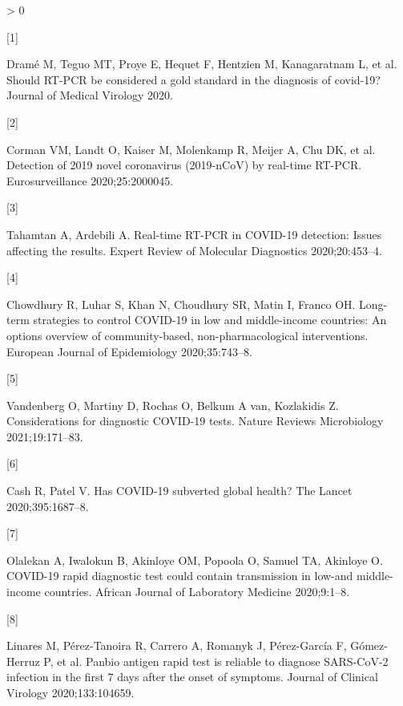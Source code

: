 \documentclass[]{elsarticle} %
\newlength{\cslhangindent}
\newlength{\csllabelwidth}
\newenvironment{CSLReferences}[2] %
 {%
  \setlength{\parindent}{0pt}
  \ifodd #1 \everypar{\setlength{\hangindent}{\cslhangindent}}\ignorespaces\fi
  \ifnum #2 > 0
  \setlength{\parskip}{#2\baselineskip}
  \fi
 }%
 {}
\newcommand{\CSLLeftMargin}[1]{\parbox[t]{\csllabelwidth}{#1}}
\newcommand{\CSLRightInline}[1]{\parbox[t]{\linewidth - \csllabelwidth}{#1}\break}
\begin{document}
\hypertarget{refs}{}
\begin{CSLReferences}{0}{0}
\leavevmode\hypertarget{ref-drame2020should}{}%
\CSLLeftMargin{{[}1{]} }
\CSLRightInline{Dramé M, Teguo MT, Proye E, Hequet F, Hentzien M, Kanagaratnam L, et al. Should RT-PCR be considered a gold standard in the diagnosis of covid-19? Journal of Medical Virology 2020.}

\leavevmode\hypertarget{ref-corman2020detection}{}%
\CSLLeftMargin{{[}2{]} }
\CSLRightInline{Corman VM, Landt O, Kaiser M, Molenkamp R, Meijer A, Chu DK, et al. Detection of 2019 novel coronavirus (2019-nCoV) by real-time RT-PCR. Eurosurveillance 2020;25:2000045.}

\leavevmode\hypertarget{ref-tahamtan2020real}{}%
\CSLLeftMargin{{[}3{]} }
\CSLRightInline{Tahamtan A, Ardebili A. Real-time RT-PCR in COVID-19 detection: Issues affecting the results. Expert Review of Molecular Diagnostics 2020;20:453--4.}

\leavevmode\hypertarget{ref-chowdhury2020long}{}%
\CSLLeftMargin{{[}4{]} }
\CSLRightInline{Chowdhury R, Luhar S, Khan N, Choudhury SR, Matin I, Franco OH. Long-term strategies to control COVID-19 in low and middle-income countries: An options overview of community-based, non-pharmacological interventions. European Journal of Epidemiology 2020;35:743--8.}

\leavevmode\hypertarget{ref-vandenberg2021considerations}{}%
\CSLLeftMargin{{[}5{]} }
\CSLRightInline{Vandenberg O, Martiny D, Rochas O, Belkum A van, Kozlakidis Z. Considerations for diagnostic COVID-19 tests. Nature Reviews Microbiology 2021;19:171--83.}

\leavevmode\hypertarget{ref-cash2020has}{}%
\CSLLeftMargin{{[}6{]} }
\CSLRightInline{Cash R, Patel V. Has COVID-19 subverted global health? The Lancet 2020;395:1687--8.}

\leavevmode\hypertarget{ref-olalekan2020covid}{}%
\CSLLeftMargin{{[}7{]} }
\CSLRightInline{Olalekan A, Iwalokun B, Akinloye OM, Popoola O, Samuel TA, Akinloye O. COVID-19 rapid diagnostic test could contain transmission in low-and middle-income countries. African Journal of Laboratory Medicine 2020;9:1--8.}

\leavevmode\hypertarget{ref-linares2020panbio}{}%
\CSLLeftMargin{{[}8{]} }
\CSLRightInline{Linares M, Pérez-Tanoira R, Carrero A, Romanyk J, Pérez-García F, Gómez-Herruz P, et al. Panbio antigen rapid test is reliable to diagnose SARS-CoV-2 infection in the first 7 days after the onset of symptoms. Journal of Clinical Virology 2020;133:104659.}


\end{CSLReferences}
\end{document}
